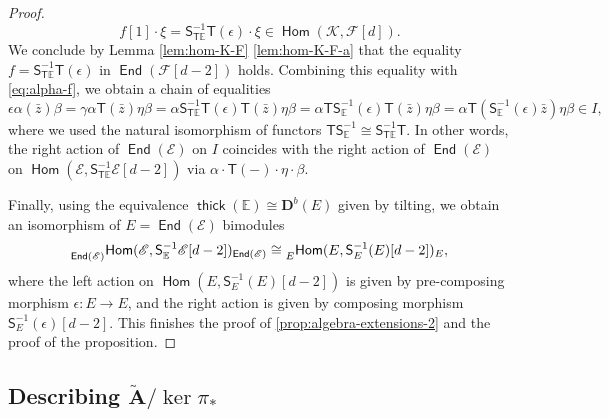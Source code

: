 \documentclass[a4paper,11pt, reqno]{amsart}
\def\E{\mathbb E}
\def\AA{\mathbf A}
\def\DD{\mathbf D}
\def\sE{\mathscr{E}}
\def\sF{\mathscr{F}}
\def\sK{\mathscr{K}}
\newcommand{\opname}[1]{\operatorname{\mathsf{#1}}}
\newcommand{\Hom}{\opname{Hom}}
\newcommand{\End}{\opname{End}}
\newcommand{\thick}{\opname{thick}\nolimits}
\def\Db{\DD^b}
\newcommand{\bS}{\mathsf{S}}
\newcommand{\bT}{\mathsf{T}}
\theoremstyle{plain}
\theoremstyle{definition}
\numberwithin{equation}{section}
\begin{document}
\begin{proof}
\[
f[1] \cdot \xi = \bS^{-1}_{\bT\E} \bT ( \epsilon ) \cdot \xi  \in \Hom (\sK , \sF [d] ) .
\]
We conclude by Lemma \ref{lem:hom-K-F} \eqref{lem:hom-K-F-a} that the equality $f = \bS_{\bT\E}^{-1} \bT ( \epsilon )$ in $\End(\sF [d-2])$ holds. 
Combining this equality with \eqref{eq:alpha-f}, we obtain a chain of equalities
\[
\epsilon \alpha ( \bar{z} ) \beta  = \gamma \alpha \bT ( \bar{z} ) \eta \beta   = \alpha \bS_{\bT\E}^{-1} \bT ( \epsilon )\bT ( \bar{z} ) \eta  \beta = \alpha \bT\bS_{\E}^{-1}  (\epsilon )\bT ( \bar{z} ) \eta  \beta = \alpha \bT ( \bS_{\E}^{-1}  ( \epsilon ) \bar{z} ) \eta  \beta  \in I ,
\]
where we used the natural isomorphism of functors $\bT\bS_{\E}^{-1}  \cong \bS^{-1}_{\bT\E}\bT$.
In other words, the right action of $\End(\sE)$ on $I$ coincides with the right action of $\End (\sE)$ on $\Hom ( \sE , \bS^{-1}_{\bT\E} \sE[d-2] )$ via $\alpha \cdot \bT(-) \cdot \eta \cdot \beta$.

Finally, using the equivalence $\thick ( \E ) \cong \Db( E )$ given by tilting, we obtain an isomorphism of $E  = \End( \sE )$ bimodules
\[
\prescript{}{\End ( \sE )}{\Hom (  \sE ,  \bS^{-1}_{\E}\sE [d-2] )}_{\End ( \sE )} 
    \cong \prescript{}{E}{\Hom ( E ,  \bS^{-1}_E ( E ) [d-2] )}_{E} ,
\]
where the left action on $\Hom ( E ,  \bS^{-1}_E ( E ) [d-2] )$ is given by pre-composing morphism $\epsilon \colon E\to E$, and the right action is given by composing morphism $\bS_E^{-1} (\epsilon )[d-2]$.
This finishes the proof of \eqref{prop:algebra-extensions-2} and the proof of the proposition.
\end{proof}





\subsection{Describing \texorpdfstring{$\tilde{\AA} / \ker \pi_*$}{Amod\textasciicircum ker}}
\end{document}
